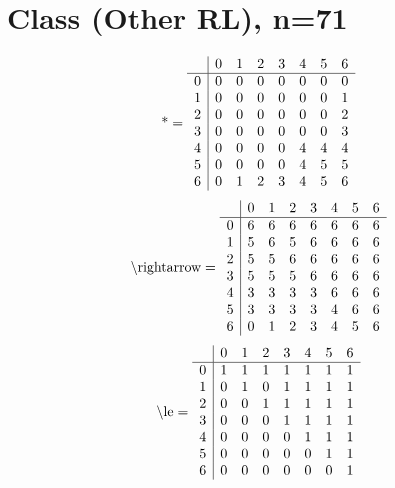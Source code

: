 \documentclass[11pt]{article}
\begin{document}
\section{Class (Other RL), n=71}
\[\text{*} = 
\begin{array}{r | r r r r r r r}
 & 0 & 1 & 2 & 3 & 4 & 5 & 6 \\ \hline
0 & 0 & 0 & 0 & 0 & 0 & 0 & 0 \\
1 & 0 & 0 & 0 & 0 & 0 & 0 & 1 \\
2 & 0 & 0 & 0 & 0 & 0 & 0 & 2 \\
3 & 0 & 0 & 0 & 0 & 0 & 0 & 3 \\
4 & 0 & 0 & 0 & 0 & 4 & 4 & 4 \\
5 & 0 & 0 & 0 & 0 & 4 & 5 & 5 \\
6 & 0 & 1 & 2 & 3 & 4 & 5 & 6 \\
\end{array}
\]
\[\text{\textbackslash rightarrow} = 
\begin{array}{r | r r r r r r r}
 & 0 & 1 & 2 & 3 & 4 & 5 & 6 \\ \hline
0 & 6 & 6 & 6 & 6 & 6 & 6 & 6 \\
1 & 5 & 6 & 5 & 6 & 6 & 6 & 6 \\
2 & 5 & 5 & 6 & 6 & 6 & 6 & 6 \\
3 & 5 & 5 & 5 & 6 & 6 & 6 & 6 \\
4 & 3 & 3 & 3 & 3 & 6 & 6 & 6 \\
5 & 3 & 3 & 3 & 3 & 4 & 6 & 6 \\
6 & 0 & 1 & 2 & 3 & 4 & 5 & 6 \\
\end{array}
\]
\[\text{\textbackslash le} = 
\begin{array}{r | r r r r r r r}
 & 0 & 1 & 2 & 3 & 4 & 5 & 6 \\ \hline
0 & 1 & 1 & 1 & 1 & 1 & 1 & 1 \\
1 & 0 & 1 & 0 & 1 & 1 & 1 & 1 \\
2 & 0 & 0 & 1 & 1 & 1 & 1 & 1 \\
3 & 0 & 0 & 0 & 1 & 1 & 1 & 1 \\
4 & 0 & 0 & 0 & 0 & 1 & 1 & 1 \\
5 & 0 & 0 & 0 & 0 & 0 & 1 & 1 \\
6 & 0 & 0 & 0 & 0 & 0 & 0 & 1 \\
\end{array}
\]
\end{document}
